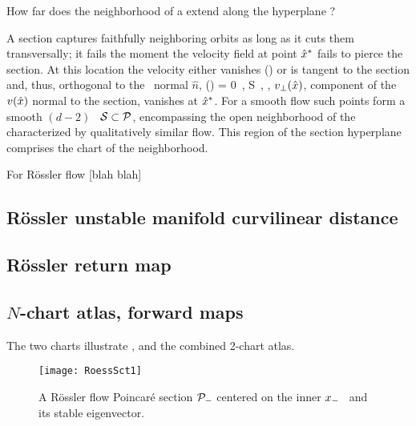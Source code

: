 How far does the neighborhood of a {\template} extend along the hyperplane
?

A section captures faithfully neighboring orbits as
long as it cuts them transversally; it fails the moment the velocity
field at point $\hat{x}^\ast$ fails to pierce the section. At this location
the velocity either vanishes (\eqv) or is tangent to the section and, thus, orthogonal to the
\template\ normal $\hat{n}$,
\beq
     \cdot \vel(\sspRSing) = 0
\,,\qquad
    \sspRSing \in S
\,,
\ie, $v_\perp(\hat{x})$, component of the $v(\hat{x})$ normal to
the section, vanishes at $\hat{x}^\ast$. For a smooth flow such points form
a smooth $(d\!-\!2)$\dmn\ \emph{\poincBord} ${\cal S} \subset {\cal P}$,
encompassing the open neighborhood of the {\template} characterized by
qualitatively similar flow. This region of the section
hyperplane comprises the chart of the {\template} neighborhood.

For R\"ossler flow 
[blah blah]

\subsection{R\"ossler unstable manifold curvilinear distance}
\subsection{R\"ossler return map}
\subsection{$N$-chart atlas, forward maps}

    \ifdraft\color{blue}


The two charts
 illustrate \poincBord,
and  the combined 2-chart atlas.

\begin{figure}%
\begin{center}
  \texttt{[image: RoessSct1]}
\end{center}
  \caption{\label{fig:RoessSct1}
  A R\"ossler flow Poincar\'e section ${\cal P}_{-}$ centered on the inner
  {\eqv} $x_{-}$ \template\ and its stable eigenvector.
}
\end{figure}

